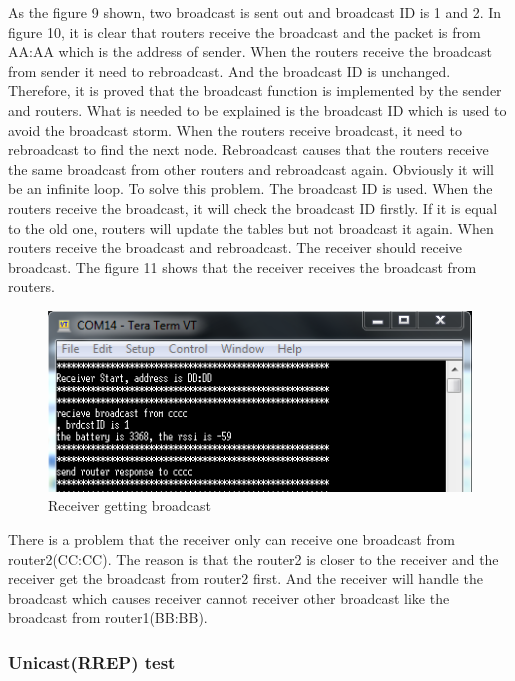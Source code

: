 \documentclass[a4paper]{article}
\begin{document}
As the figure 9 shown, two broadcast is sent out and broadcast ID is 1 and 2. In figure 10, it is clear that routers receive the broadcast and the packet is from AA:AA which is the address of sender. When the routers receive the broadcast from sender it need to rebroadcast. And the broadcast ID is unchanged. Therefore, it is proved that the broadcast function is implemented by the sender and routers. What is needed to be explained is the broadcast ID which is used to avoid the broadcast storm. When the routers receive broadcast, it need to rebroadcast to find the next node. Rebroadcast causes that the routers receive the same broadcast from other routers and rebroadcast again. Obviously it will be an infinite loop. To solve this problem. The broadcast ID is used. When the routers receive the broadcast, it will check the broadcast ID firstly. If it is equal to the old one, routers will update the tables but not broadcast it again.
When routers receive the broadcast and rebroadcast. The receiver should receive broadcast. The figure 11 shows that the receiver receives the broadcast from routers.

\begin{figure}[!htb]
   \centering
   \includegraphics[scale=0.8]{test3}
	\begin{center}
	   \caption{Receiver getting broadcast}
	\end{center}	   
    \label{fig:test3}
\end{figure}

There is a problem that the receiver only can receive one broadcast from router2(CC:CC). The reason is that the router2 is closer to the receiver and the receiver get the broadcast from router2 first. And the receiver will handle the broadcast which causes receiver cannot receiver other broadcast like the broadcast from router1(BB:BB).

\subsubsection{Unicast(RREP) test}
\end{document}
